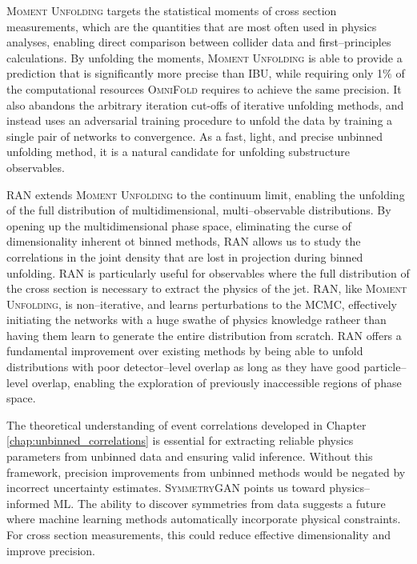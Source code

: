         \textsc{Moment Unfolding} targets the statistical moments of cross section measurements, which are the quantities that are most often used in physics analyses, enabling direct comparison between collider data and first--principles calculations.
        By unfolding the moments, \textsc{Moment Unfolding} is able to provide a prediction that is significantly more precise than IBU, while requiring only 1\(\%\) of the computational resources \textsc{OmniFold} requires to achieve the same precision.
        It also abandons the arbitrary iteration cut-offs of iterative unfolding methods, and instead uses an adversarial training procedure to unfold the data by training a single pair of networks to convergence.
        As a fast, light, and precise unbinned unfolding method, it is a natural candidate for unfolding substructure observables.
        
        RAN extends \textsc{Moment Unfolding} to the continuum limit, enabling the unfolding of the full distribution of multidimensional, multi--observable distributions.
        By opening up the multidimensional phase space, eliminating the curse of dimensionality inherent ot binned methods, RAN allows us to study the correlations in the joint density that are lost in projection during binned unfolding.
        RAN is particularly useful for observables where the full distribution of the cross section is necessary to extract the physics of the jet.
        RAN, like \textsc{Moment Unfolding}, is non--iterative, and learns perturbations to the MCMC, effectively initiating the networks with a huge swathe of physics knowledge ratheer than having them learn to generate the entire distribution from scratch.
        RAN offers a fundamental improvement over existing methods by being able to unfold distributions with poor detector--level overlap as long as they have good particle--level overlap, enabling the exploration of previously inaccessible regions of phase space.
        
        The theoretical understanding of event correlations developed in Chapter \ref{chap:unbinned_correlations} is essential for extracting reliable physics parameters from unbinned data and ensuring valid inference.
        Without this framework, precision improvements from unbinned methods would be negated by incorrect uncertainty estimates.
        \textsc{SymmetryGAN} points us toward physics--informed ML.
        The ability to discover symmetries from data suggests a future where machine learning methods automatically incorporate physical constraints.
        For cross section measurements, this could reduce effective dimensionality and improve precision.
    
